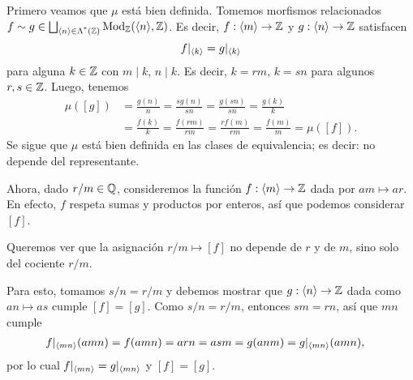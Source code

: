 \begin{sol}
    Primero veamos que $\mu$ está bien definida.
    Tomemos morfismos relacionados
    $f\sim g\in\bigsqcup_{\langle n\rangle\in\Lambda^{\text{*}}({\mathbb Z})}\mathrm{Mod}_\mathbb Z(\langle n\rangle,\mathbb Z)$.
    Es decir, $f:\langle m\rangle\to\mathbb Z$ y $g:\langle n\rangle\to\mathbb Z$ satisfacen
    \[
        f|_{\langle k\rangle} = g|_{\langle k\rangle}
    \]
    para alguna $k\in\mathbb Z$ con $m\mid k$, $n\mid k$.
    Es decir, $k=rm$, $k=sn$ para algunos $r,s\in\mathbb Z$.
    Luego, tenemos
    \begin{align*}
        \mu([g])
        &= \frac {g(n)} n
        = \frac {sg(n)}{sn} 
        = \frac {g(sn)}{sn} 
        = \frac {g(k)}{k} \\
        &= \frac {f(k)}{k} 
        = \frac {f(rm)}{rm} 
        = \frac {rf(m)}{rm} 
        = \frac {f(m)}{m} 
        = \mu([f]).
    \end{align*}
    Se sigue que $\mu$ está bien definida
    en las clases de equivalencia;
    es decir: no depende del representante.

    Ahora, dado $r/m\in\mathbb Q$, consideremos la función
    $f:\langle m\rangle\to\mathbb Z$ dada por $am\mapsto ar$.
    En efecto, $f$ respeta sumas y productos por enteros,
    así que podemos considerar $[f]$.
    
    Queremos ver que la asignación $r/m\mapsto [f]$ no
    depende de $r$ y de $m$, sino solo del cociente $r/m$.
    
    Para esto, tomamos $s/n=r/m$ y
    debemos mostrar que $g:\langle n\rangle\to\mathbb Z$
    dada como $an\mapsto as$ cumple $[f]=[g]$.
    Como $s/n=r/m$, entonces $sm=rn$, así que $mn$ cumple
    \begin{align*}
        f|_{\langle mn\rangle}(amn)
        &= f(amn)
        = arn
        = asm
        = g(anm)
        = g|_{\langle mn\rangle}(amn),
    \end{align*}
    por lo cual $f|_{\langle mn\rangle}=g|_{\langle mn\rangle}$ y $[f]=[g]$.
    

\end{sol}
